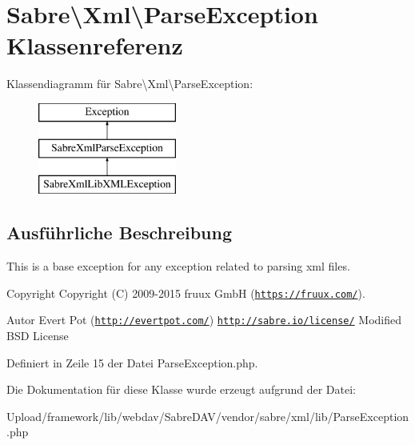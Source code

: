 \hypertarget{class_sabre_1_1_xml_1_1_parse_exception}{}\section{Sabre\textbackslash{}Xml\textbackslash{}Parse\+Exception Klassenreferenz}
\label{class_sabre_1_1_xml_1_1_parse_exception}
Klassendiagramm für Sabre\textbackslash{}Xml\textbackslash{}Parse\+Exception\+:\begin{figure}[H]
\begin{center}
\leavevmode
\includegraphics[height=3.000000cm]{class_sabre_1_1_xml_1_1_parse_exception}
\end{center}
\end{figure}


\subsection{Ausführliche Beschreibung}
This is a base exception for any exception related to parsing xml files.

\begin{DoxyCopyright}{Copyright}
Copyright (C) 2009-\/2015 fruux GmbH (\href{https://fruux.com/}{\tt https\+://fruux.\+com/}). 
\end{DoxyCopyright}
\begin{DoxyAuthor}{Autor}
Evert Pot (\href{http://evertpot.com/}{\tt http\+://evertpot.\+com/})  \href{http://sabre.io/license/}{\tt http\+://sabre.\+io/license/} Modified B\+SD License 
\end{DoxyAuthor}


Definiert in Zeile 15 der Datei Parse\+Exception.\+php.



Die Dokumentation für diese Klasse wurde erzeugt aufgrund der Datei\+:\begin{DoxyCompactItemize}
\item 
Upload/framework/lib/webdav/\+Sabre\+D\+A\+V/vendor/sabre/xml/lib/Parse\+Exception.\+php\end{DoxyCompactItemize}
